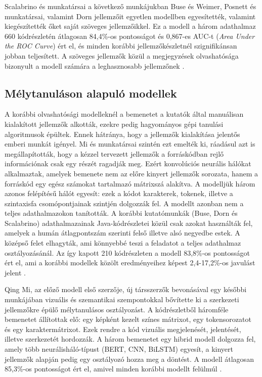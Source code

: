 \documentclass[
]{elteikthesis}[2024/04/26]
\begin{document}
Scalabrino és munkatársai a következő munkájukban Buse és Weimer, Posnett és
munkatársai, valamint Dorn jellemzőit egyetlen modellben egyesítették, valamint
kiegészítették őket saját szöveges jellemzőikkel. Ez a modell a három adathalmaz
660 kódrészletén átlagosan 84,4\%-os pontosságot és 0,867-es AUC-t (\textit{Area
Under the ROC Curve}) ért el, és minden korábbi jellemzőkészletnél
szignifikánsan jobban teljesített. A szöveges jellemzők közül a megjegyzések
olvashatósága bizonyult a modell számára a leghasznosabb jellemzőnek
\cite{scalabrino2018comprehensive}.

\subsection{Mélytanuláson alapuló modellek}
\label{sec:related:models:deep}

A korábbi olvashatósági modelleknél a bemenetet a kutatók által manuálisan
kialakított jellemzők alkották, ezekre pedig hagyományos gépi tanulási
algoritmusok épültek. Ennek hátránya, hogy a jellemzők kialakítása jelentős
emberi munkát igényel. Mi és munkatársai szintén ezt emelték ki, ráadásul azt is
megállapították, hogy a kézzel tervezett jellemzők a forráskódban rejlő
információnak csak egy részét ragadják meg. Ezért konvolúciós neurális hálókat
alkalmaztak, amelyek bemenete nem az előre kinyert jellemzők sorozata, hanem a
forráskód egy egész számokat tartalmazó mátrixszá alakítva. A modelljük három
azonos felépítésű hálót egyesít: ezek a kódot karakterek, tokenek, illetve a
szintaxisfa csomópontjainak szintjén dolgozzák fel. A modellt azonban nem a
teljes adathalmazokon tanították. A korábbi kutatómunkák (Buse, Dorn és
Scalabrino) adathalmazainak Java-kódrészletei közül csak azokat használták fel,
amelyek a humán átlagpontszám szerinti felső illetve alsó negyedbe estek. A
középső felet elhagyták, ami könnyebbé teszi a feladatot a teljes adathalmaz
osztályozásánál. Az így kapott 210 kódrészleten a modell 83,8\%-os pontosságot
ért el, ami a korábbi modellek közölt eredményeihez képest 2,4-17,2\%-os
javulást jelent \cite{mi2018improving}.

Qing Mi, az előző modell első szerzője, új társszerzők bevonásával egy későbbi %
munkájában vizuális és szemantikai szempontokkal bővítette ki a szerkezeti
jellemzőkre épülő mélytanulásos osztályozást. A kódrészletből háromféle
bemenetet állítottak elő: egy képként kezelt színes mátrixot, egy tokensorozatot
és egy karaktermátrixot. Ezek rendre a kód vizuális megjelenését, jelentését,
illetve szerkezetét hordozzák. A három bemenetet egy hibrid modell dolgozza fel,
amely több neurálisháló-típust (BERT, CNN, BiLSTM) egyesít, a kinyert jellemzők
alapján pedig egy osztályozó hozza meg a döntést. A modell átlagosan 85,3\%-os
pontosságot ért el, amivel minden korábbi modellt felülmúl \cite{mi2022towards}.
\end{document}
